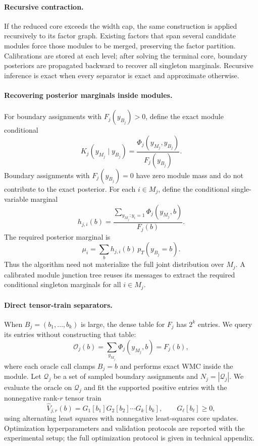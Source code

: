 \documentclass[letterpaper]{article}
\newif\ifincludesupplement
\newcommand{\suppref}[1]{\ifincludesupplement Appendix~\csname ref\endcsname{#1}\else technical appendix\fi}
\begin{document}
\paragraph{Recursive contraction.}
If the reduced core exceeds the width cap, the same construction is
applied recursively to its factor graph. Existing factors that span
several candidate modules force those modules to be merged, preserving the
factor partition. Calibrations are stored at each level; after solving the
terminal core, boundary posteriors are propagated backward to recover all
singleton marginals. Recursive inference is exact when every separator is
exact and approximate otherwise.

\paragraph{Recovering posterior marginals inside modules.}
For boundary assignments with \(F_j(y_{B_j})>0\), define the exact module
conditional
\[
K_j(y_{M_j}\mid y_{B_j})
=
\frac{\Phi_j(y_{M_j},y_{B_j})}{F_j(y_{B_j})}.
\]
Boundary assignments with \(F_j(y_{B_j})=0\) have zero module mass and do
not contribute to the exact posterior. For each \(i\in M_j\), define the
conditional single-variable marginal
\[
h_{j,i}(b)
=
\frac{
\sum_{y_{M_j}:y_i=1}
\Phi_j(y_{M_j},b)
}{
F_j(b)
}.
\]
The required posterior marginal is
\[
\mu_i
=
\sum_b h_{j,i}(b)\,p_T(y_{B_j}=b).
\]
Thus the algorithm need not materialize the full joint distribution over
\(M_j\). A calibrated module junction tree reuses its messages to extract
the required conditional singleton marginals for all \(i\in M_j\).

\paragraph{Direct tensor-train separators.}
When \(B_j=(b_1,\ldots,b_k)\) is large, the dense table for \(F_j\) has
\(2^k\) entries. We query its entries without constructing that table:
\[
\mathcal O_j(b)
=
\sum_{y_{M_j}}\Phi_j(y_{M_j},b)
=F_j(b),
\]
where each oracle call clamps \(B_j=b\) and performs exact WMC inside the
module. Let \(\mathcal Q_j\) be a set of sampled boundary assignments and
\(N_j=|\mathcal Q_j|\). We evaluate the oracle on \(\mathcal Q_j\) and
fit the supported positive entries with the nonnegative rank-\(r\)
tensor train
\[
\widehat V_{j,r}(b)
=
G_1[b_1]G_2[b_2]\cdots G_k[b_k],
\qquad G_\ell[b_\ell]\geq 0,
\]
using alternating least squares with nonnegative least-squares core
updates. Optimization hyperparameters and validation protocols are reported
with the experimental setup; the full optimization protocol is given in
\suppref{app:direct-tt-optimization}.
\end{document}
